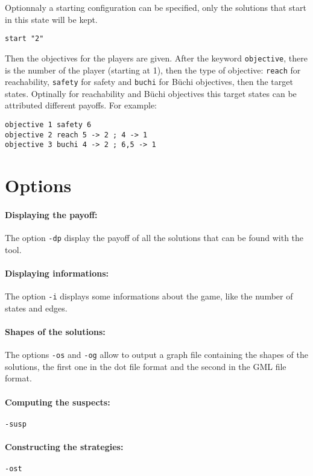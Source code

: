 \documentclass{article}
\begin{document}
Optionnaly a starting configuration can be specified, only the
solutions that start in this state will be kept.
\begin{verbatim}
start "2"
\end{verbatim}

Then the objectives for the players are given. 
After the keyword \texttt{objective}, there is the number of the
player (starting at 1), then the type of objective: \texttt{reach} for
reachability, \texttt{safety} for safety and \texttt{buchi} for
B\"uchi objectives, then the target states.
Optinally for reachability and B\"uchi objectives this target states
can be attributed different payoffs.
For example:
\begin{verbatim}
objective 1 safety 6
objective 2 reach 5 -> 2 ; 4 -> 1
objective 3 buchi 4 -> 2 ; 6,5 -> 1
\end{verbatim}

\section{Options}

\paragraph{Displaying the payoff:}
The option \texttt{-dp} display the payoff of all the solutions that
can be found with the tool.

\paragraph{Displaying informations:}
The option \texttt{-i} displays some informations about the game, like
the number of states and edges.

\paragraph{Shapes of the solutions:}
The options \texttt{-os} and \texttt{-og} allow to output a graph
file containing the shapes of the solutions, the first one in the dot
file format and the second in the GML file format.

\paragraph{Computing the suspects:}
\texttt{-susp}

\paragraph{Constructing the strategies:}
\texttt{-ost}
\end{document}
